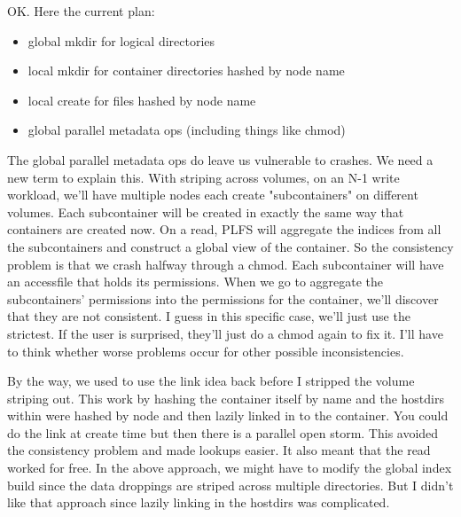 \documentclass[10pt]{article}
\begin{document}
OK.  Here the current plan:

\begin{itemize}
\item{global mkdir for logical directories}
\item{local mkdir for container directories hashed by node name}
\item{local create for files hashed by node name}
\item{global parallel metadata ops (including things like chmod)}
\end{itemize}

The global parallel metadata ops do leave us vulnerable to crashes.  We
need a new term to explain this.  With striping across volumes, on an
N-1 write workload, we'll have multiple nodes each create
"subcontainers" on different volumes.  Each subcontainer will be created
in exactly the same way that containers are created now.  On a read,
PLFS will aggregate the indices from all the subcontainers and construct
a global view of the container.  So the consistency problem is that we
crash halfway through a chmod.  Each subcontainer will have an
accessfile that holds its permissions.  When we go to aggregate the
subcontainers' permissions into the permissions for the container, we'll
discover that they are not consistent.  I guess in this specific case,
we'll just use the strictest.  If the user is surprised, they'll just do
a chmod again to fix it.  I'll have to think whether worse problems
occur for other possible inconsistencies.


By the way, we used to use the link idea back before I stripped the
volume striping out.  This work by hashing the container itself by name
and the hostdirs within were hashed by node and then lazily linked in to
the container.  You could do the link at create time but then there is a
parallel open storm.  This avoided the consistency problem and made
lookups easier.  It also meant that the read worked for free.  In the
above approach, we might have to modify the global index build since the
data droppings are striped across multiple directories.  But I didn't
like that approach since lazily linking in the hostdirs was complicated.
\end{document}
